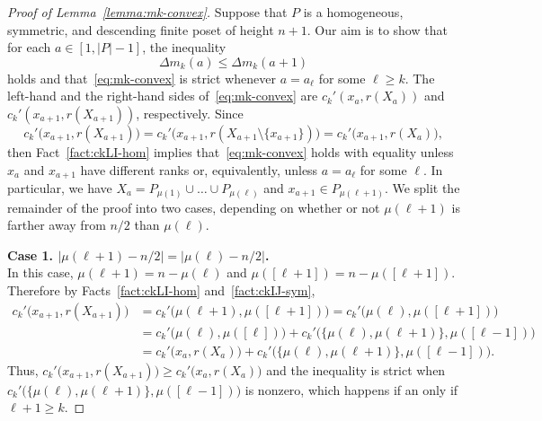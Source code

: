 \documentclass[11pt,a4paper,reqno]{amsart}
\numberwithin{claim}{thm}
\theoremstyle{definition}
\renewcommand{\le}{\leqslant}
\renewcommand{\ge}{\geqslant}
\begin{document}
\begin{proof}[{Proof of Lemma~\ref{lemma:mk-convex}}]
  Suppose that $P$ is a homogeneous, symmetric, and descending finite poset of height $n+1$. Our aim is to show that for each $a \in [1,|P|-1]$, the inequality
  \begin{equation}
    \label{eq:mk-convex}
    \Delta m_k(a) \le \Delta m_k(a+1)
  \end{equation}
  holds and that~\eqref{eq:mk-convex} is strict whenever $a = a_\ell$ for some $\ell \ge k$. The left-hand and the right-hand sides of~\eqref{eq:mk-convex} are $c_k'(x_a, r(X_a))$ and $c_k'(x_{a+1}, r(X_{a+1}))$, respectively. Since
  \[
    c_k'\big(x_{a+1}, r(X_{a+1})\big) = c_k'\big(x_{a+1}, r(X_{a+1} \setminus \{x_{a+1}\})\big) = c_k'\big(x_{a+1}, r(X_a)\big),
  \]
  then Fact~\ref{fact:ckLI-hom} implies that~\eqref{eq:mk-convex} holds with equality unless $x_a$ and $x_{a+1}$ have different ranks or, equivalently, unless $a = a_\ell$ for some $\ell$. In particular, we have $X_a = P_{\mu(1)} \cup \dotsc \cup P_{\mu(\ell)}$ and $x_{a+1} \in P_{\mu(\ell+1)}$. We split the remainder of the proof into two cases, depending on whether or not $\mu(\ell+1)$ is farther away from $n/2$ than $\mu(\ell)$.

  \noindent
  \textbf{Case 1. $|\mu(\ell+1) - n/2| = |\mu(\ell) - n/2|$.} \\
  In this case, $\mu(\ell+1) = n - \mu(\ell)$ and $\mu([\ell+1]) = n - \mu([\ell+1])$. Therefore by Facts~\ref{fact:ckLI-hom} and~\ref{fact:ckIJ-sym},
  \[
    \begin{split}
      c_k'\big(x_{a+1}, r(X_{a+1})\big) & = c_k'\big(\mu(\ell+1), \mu([\ell+1])\big) = c_k'\big(\mu(\ell), \mu([\ell+1])\big) \\
      & = c_k'\big(\mu(\ell), \mu([\ell])\big) + c_k'\big(\{\mu(\ell), \mu(\ell+1)\}, \mu([\ell-1])\big) \\
      & = c_k'\big(x_a, r(X_a)\big) + c_k'\big(\{\mu(\ell), \mu(\ell+1)\}, \mu([\ell-1])\big).
    \end{split}
  \]
  Thus, $c_k'\big(x_{a+1}, r(X_{a+1})\big) \ge c_k'\big(x_a, r(X_a)\big)$ and the inequality is strict when $c_k'\big(\{\mu(\ell), \mu(\ell+1)\}, \mu([\ell-1])\big)$ is nonzero, which happens if an only if $\ell+1 \ge k$.


\end{proof}
\end{document}
